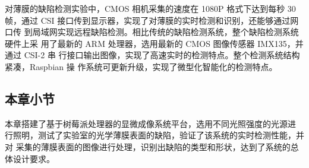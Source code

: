 对薄膜的缺陷检测实验中，CMOS 相机采集的速度在 1080P 格式下达到每秒 30 帧，通过 CSI 接口传到显示器，实现了对薄膜的实时检测和识别，还能够通过网口传 到局域网实现远程缺陷检测。相比传统的缺陷检测系统，整个缺陷检测系统硬件上采 用了最新的 ARM 处理器，选用最新的 CMOS 图像传感器 IMX135，并通过 CSI-2 串 行接口输出图像，实现了高速实时的检测特点。整个检测系统结构紧凑，Raspbian 操 作系统可更新升级，实现了微型化智能化的检测特点。
\subsection{本章小节}
本章搭建了基于树莓派处理器的显微成像系统平台，选用不同光照强度的光源进 行照明，测试了实验室的光学薄膜表面的缺陷，验证了该系统的实时检测性能，并对 采集的薄膜表面的图像进行处理，识别出缺陷的类型和形状，达到了系统的总体设计要求。
